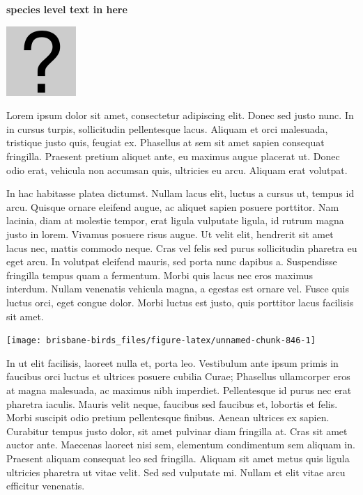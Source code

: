 \documentclass[]{book}
\let\origfigure\figure
\let\endorigfigure\endfigure
\renewenvironment{figure}[1][2] {
  \expandafter\origfigure\expandafter[H]
} {
  \endorigfigure
}
\begin{document}
\textbf{species level text in here}

\begin{figure}
\centering
\includegraphics{assets/missing.png}
\caption{No image for species}
\end{figure}

Lorem ipsum dolor sit amet, consectetur adipiscing elit. Donec sed justo
nunc. In in cursus turpis, sollicitudin pellentesque lacus. Aliquam et
orci malesuada, tristique justo quis, feugiat ex. Phasellus at sem sit
amet sapien consequat fringilla. Praesent pretium aliquet ante, eu
maximus augue placerat ut. Donec odio erat, vehicula non accumsan quis,
ultricies eu arcu. Aliquam erat volutpat.

In hac habitasse platea dictumst. Nullam lacus elit, luctus a cursus ut,
tempus id arcu. Quisque ornare eleifend augue, ac aliquet sapien posuere
porttitor. Nam lacinia, diam at molestie tempor, erat ligula vulputate
ligula, id rutrum magna justo in lorem. Vivamus posuere risus augue. Ut
velit elit, hendrerit sit amet lacus nec, mattis commodo neque. Cras vel
felis sed purus sollicitudin pharetra eu eget arcu. In volutpat eleifend
mauris, sed porta nunc dapibus a. Suspendisse fringilla tempus quam a
fermentum. Morbi quis lacus nec eros maximus interdum. Nullam venenatis
vehicula magna, a egestas est ornare vel. Fusce quis luctus orci, eget
congue dolor. Morbi luctus est justo, quis porttitor lacus facilisis sit
amet.

\begin{figure}
\texttt{[image: brisbane-birds\_files/figure-latex/unnamed-chunk-846-1]} \caption{insert figure caption}\label{fig:unnamed-chunk-846}
\end{figure}

In ut elit facilisis, laoreet nulla et, porta leo. Vestibulum ante ipsum
primis in faucibus orci luctus et ultrices posuere cubilia Curae;
Phasellus ullamcorper eros at magna malesuada, ac maximus nibh
imperdiet. Pellentesque id purus nec erat pharetra iaculis. Mauris velit
neque, faucibus sed faucibus et, lobortis et felis. Morbi suscipit odio
pretium pellentesque finibus. Aenean ultrices ex sapien. Curabitur
tempus justo dolor, sit amet pulvinar diam fringilla at. Cras sit amet
auctor ante. Maecenas laoreet nisi sem, elementum condimentum sem
aliquam in. Praesent aliquam consequat leo sed fringilla. Aliquam sit
amet metus quis ligula ultricies pharetra ut vitae velit. Sed sed
vulputate mi. Nullam et elit vitae arcu efficitur venenatis.
\end{document}
